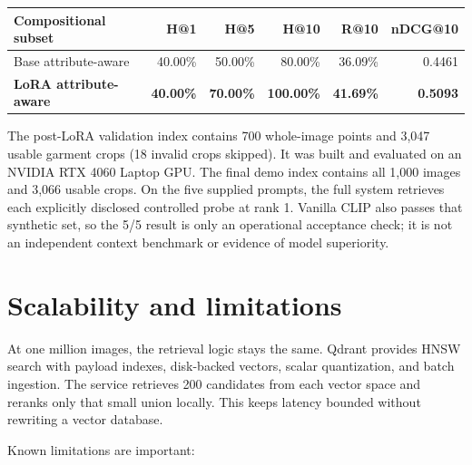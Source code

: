 \documentclass[11pt]{article}
\begin{document}
\begin{center}
\small
\begin{tabular}{@{}lrrrrr@{}}
\toprule
\textbf{Compositional subset} & \textbf{H@1} & \textbf{H@5} & \textbf{H@10} & \textbf{R@10} & \textbf{nDCG@10} \\
\midrule
Base attribute-aware & 40.00\% & 50.00\% & 80.00\% & 36.09\% & 0.4461 \\
\textbf{LoRA attribute-aware} & \textbf{40.00\%} & \textbf{70.00\%} & \textbf{100.00\%} & \textbf{41.69\%} & \textbf{0.5093} \\
\bottomrule
\end{tabular}
\end{center}

The post-LoRA validation index contains 700 whole-image points and 3,047 usable garment crops (18 invalid crops skipped). It was built and evaluated on an NVIDIA RTX 4060 Laptop GPU. The final demo index contains all 1,000 images and 3,066 usable crops. On the five supplied prompts, the full system retrieves each explicitly disclosed controlled probe at rank 1. Vanilla CLIP also passes that synthetic set, so the 5/5 result is only an operational acceptance check; it is not an independent context benchmark or evidence of model superiority.

\section{Scalability and limitations}

At one million images, the retrieval logic stays the same. Qdrant provides HNSW search with payload indexes, disk-backed vectors, scalar quantization, and batch ingestion. The service retrieves 200 candidates from each vector space and reranks only that small union locally. This keeps latency bounded without rewriting a vector database.

Known limitations are important:
\end{document}
